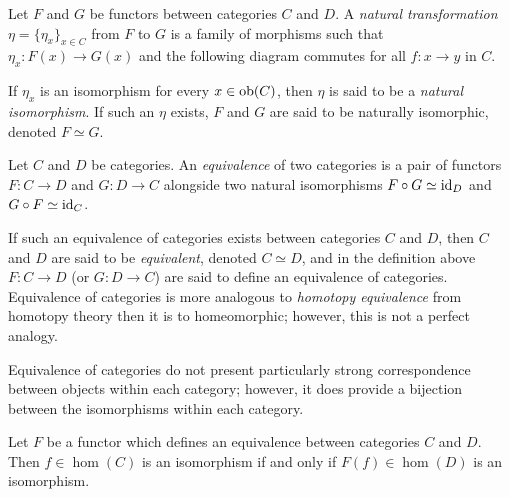 \begin{definition}
    Let $F$ and $G$ be functors between categories $C$ and $D$. A \emph{natural transformation} $\eta = \{\eta_x\}_{x \in C}$ from $F$ to $G$ is a family of morphisms such that $\eta_x: F(x) \to G(x)$ and the following diagram commutes for all $f: x \to y$ in $C$.
    \begin{center}
    \end{center}
    If $\eta_x$ is an isomorphism for every $x \in \operatorname{ob}(C)$, then $\eta$ is said to be a \emph{natural isomorphism}. If such an $\eta$ exists, $F$ and $G$ are said to be naturally isomorphic, denoted $F \simeq G$.
\end{definition}

\begin{definition}
    Let $C$ and $D$ be categories. An \emph{equivalence} of two categories is a pair of functors $F: C \to D$ and $G: D \to C$ alongside two natural isomorphisms $F \circ G \simeq \operatorname{id}_D$ and $G \circ F \simeq \operatorname{id}_C$.
\end{definition}

If such an equivalence of categories exists between categories $C$ and $D$, then $C$ and $D$ are said to be \emph{equivalent}, denoted $C \simeq D$, and in the definition above $F: C \to D$ (or $G: D \to C$) are said to define an equivalence of categories. Equivalence of categories is more analogous to \emph{homotopy equivalence} from homotopy theory then it is to homeomorphic; however, this is not a perfect analogy.

Equivalence of categories do not present particularly strong correspondence between objects within each category; however, it does provide a bijection between the isomorphisms within each category.

\begin{corollary} \label{cor:equivalence-functor-give-bijection-on-isomorphisms}
    Let $F$ be a functor which defines an equivalence between categories $C$ and $D$. Then $f \in \hom(C)$ is an isomorphism if and only if $F(f) \in \hom(D)$ is an isomorphism.
\end{corollary}
